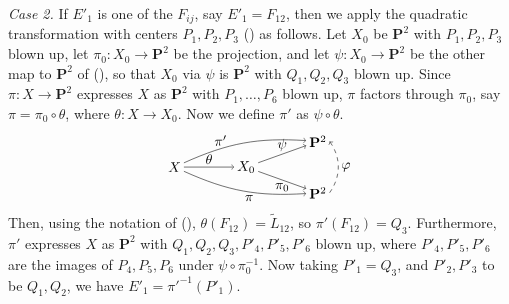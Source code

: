 {\emph{Case 2.} If $E'_1$ is one of the $F_{ij}$, say $E'_1=F_{12}$, then we apply the quadratic transformation with centers $P_1,P_2,P_3$ () as follows. Let $X_0$ be $\mathbf P^2$ with $P_1,P_2,P_3$ blown up, let $\pi_0\colon X_0\to\mathbf P^2$ be the projection, and let $\psi\colon X_0\to\mathbf P^2$ be the other map to $\mathbf P^2$ of (), so that $X_0$ via $\psi$ is $\mathbf P^2$ with $Q_1,Q_2,Q_3$ blown up. Since $\pi\colon X\to\mathbf P^2$ expresses $X$ as $\mathbf P^2$ with $P_1,\dots,P_6$ blown up, $\pi$ factors through $\pi_0$, say $\pi=\pi_0\circ\theta$, where $\theta\colon X\to X_0$. Now we define $\pi'$ as $\psi\circ\theta$.
\[
\begin{tikzpicture}[baseline=(x.base),every node/.style={inner sep=2pt}]
\node (x) at (0,0) {$X$};
\node (x0) at (1.8,0) {$X_0$};
\node (p1) at (3.6,.65) {$\mathbf P^2$};
\node (p2) at (3.6,-.65) {$\mathbf P^2$};
\draw[->] (x) -- node[above] {$\theta$} (x0);
\draw[->] (x0) -- node[above] {$\psi$} (p1);
\draw[->] (x0) -- node[below] {$\pi_0$} (p2);
\draw[->] (x) to[bend left=14] node[above,pos=.3] {$\pi'$} (p1);
\draw[->] (x) to[bend right=14] node[below,pos=.55] {$\pi$} (p2);
\draw[dashed,->] (p2.east) to[bend right=35] node[right] {$\varphi$} (p1.east);
\end{tikzpicture}
\]
Then, using the notation of (), $\theta(F_{12})=\widetilde L_{12}$, so $\pi'(F_{12})=Q_3$. Furthermore, $\pi'$ expresses $X$ as $\mathbf P^2$ with $Q_1,Q_2,Q_3,P'_4,P'_5,P'_6$ blown up, where $P'_4,P'_5,P'_6$ are the images of $P_4,P_5,P_6$ under $\psi\circ\pi_0^{-1}$. Now taking $P'_1=Q_3$, and $P'_2,P'_3$ to be $Q_1,Q_2$, we have $E'_1=\pi'^{-1}(P'_1)$.}
